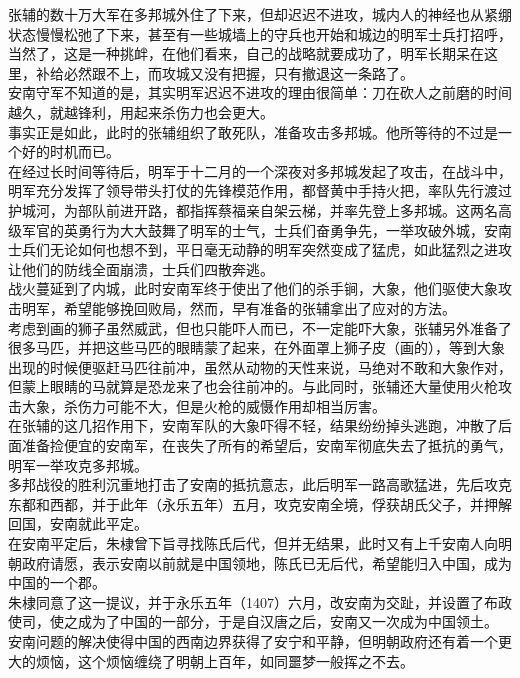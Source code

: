 \begin{multicols}{\theparacolNo}
张辅的数十万大军在多邦城外住了下来，但却迟迟不进攻，城内人的神经也从紧绷状态慢慢松弛了下来，甚至有一些城墙上的守兵也开始和城边的明军士兵打招呼，当然了，这是一种挑衅，在他们看来，自己的战略就要成功了，明军长期呆在这里，补给必然跟不上，而攻城又没有把握，只有撤退这一条路了。\\

安南守军不知道的是，其实明军迟迟不进攻的理由很简单：刀在砍人之前磨的时间越久，就越锋利，用起来杀伤力也会更大。\\

事实正是如此，此时的张辅组织了敢死队，准备攻击多邦城。他所等待的不过是一个好的时机而已。\\

在经过长时间等待后，明军于十二月的一个深夜对多邦城发起了攻击，在战斗中，明军充分发挥了领导带头打仗的先锋模范作用，都督黄中手持火把，率队先行渡过护城河，为部队前进开路，都指挥蔡福亲自架云梯，并率先登上多邦城。这两名高级军官的英勇行为大大鼓舞了明军的士气，士兵们奋勇争先，一举攻破外城，安南士兵们无论如何也想不到，平日毫无动静的明军突然变成了猛虎，如此猛烈之进攻让他们的防线全面崩溃，士兵们四散奔逃。\\

战火蔓延到了内城，此时安南军终于使出了他们的杀手锏，大象，他们驱使大象攻击明军，希望能够挽回败局，然而，早有准备的张辅拿出了应对的方法。\\

考虑到画的狮子虽然威武，但也只能吓人而已，不一定能吓大象，张辅另外准备了很多马匹，并把这些马匹的眼睛蒙了起来，在外面罩上狮子皮（画的），等到大象出现的时候便驱赶马匹往前冲，虽然从动物的天性来说，马绝对不敢和大象作对，但蒙上眼睛的马就算是恐龙来了也会往前冲的。与此同时，张辅还大量使用火枪攻击大象，杀伤力可能不大，但是火枪的威慑作用却相当厉害。\\

在张辅的这几招作用下，安南军队的大象吓得不轻，结果纷纷掉头逃跑，冲散了后面准备捡便宜的安南军，在丧失了所有的希望后，安南军彻底失去了抵抗的勇气，明军一举攻克多邦城。\\

多邦战役的胜利沉重地打击了安南的抵抗意志，此后明军一路高歌猛进，先后攻克东都和西都，并于此年（永乐五年）五月，攻克安南全境，俘获胡氏父子，并押解回国，安南就此平定。\\

在安南平定后，朱棣曾下旨寻找陈氏后代，但并无结果，此时又有上千安南人向明朝政府请愿，表示安南以前就是中国领地，陈氏已无后代，希望能归入中国，成为中国的一个郡。\\

朱棣同意了这一提议，并于永乐五年（1407）六月，改安南为交趾，并设置了布政使司，使之成为了中国的一部分，于是自汉唐之后，安南又一次成为中国领土。\\

安南问题的解决使得中国的西南边界获得了安宁和平静，但明朝政府还有着一个更大的烦恼，这个烦恼缠绕了明朝上百年，如同噩梦一般挥之不去。\\
\ifnum{}
	\end{multicols}
\fi
\newpage
